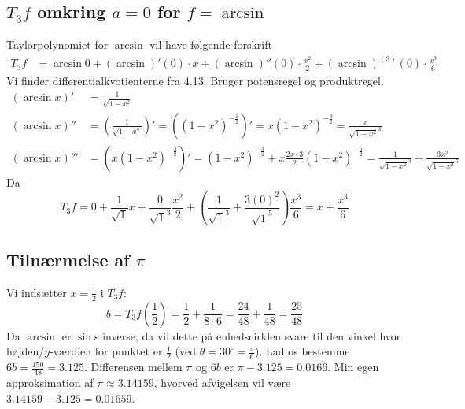\documentclass{report}
\begin{document}
\subsection{$T_3f$ omkring $a=0$ for $f=\arcsin$}
Taylorpolynomiet for $\arcsin$ vil have følgende forskrift
\begin{align}
    T_3f&=\arcsin{0}+\left(\arcsin\right)'(0)\cdot x+\left(\arcsin\right)''(0)\cdot\frac{x^2}{2}+\left(\arcsin\right)^{(3)}(0)\cdot\frac{x^3}{6}
\end{align}
Vi finder differentialkvotienterne fra 4.13. Bruger potensregel og produktregel.
\begin{align*}
    (\arcsin{x})'&=\frac{1}{\sqrt{1-x^2}}\\
    (\arcsin{x})''&=\left(\frac{1}{\sqrt{1-x^2}}\right)'=\left((1-x^2)^{-\frac{1}{2}}\right)'=x(1-x^2)^{-\frac{3}{2}}=\frac{x}{\sqrt{1-x^2}^3}\\
    (\arcsin{x})'''&=\left(x(1-x^2)^{-\frac{3}{2}}\right)'=(1-x^2)^{-\frac{3}{2}}+x\frac{2x\cdot3}{2}(1-x^2)^{-\frac{5}{2}}=\frac{1}{\sqrt{1-x^2}^3}+\frac{3x^2}{\sqrt{1-x^2}^5}
\end{align*}Da 
$$T_3f=0+\frac{1}{\sqrt{1}}x+\frac{0}{\sqrt{1}^3}\frac{x^2}{2}+\left(\frac{1}{\sqrt{1}^3}+\frac{3(0)^2}{\sqrt{1}^5}\right)\frac{x^3}{6}=x+\frac{x^3}{6}$$
\subsection{Tilnærmelse af $\pi$}
Vi indsætter $x=\frac{1}{2}$ i $T_3f$:\begin{equation}
    b=T_3f\left(\frac{1}{2}\right)=\frac{1}{2}+\frac{1}{8\cdot6}=\frac{24}{48}+\frac{1}{48}=\frac{25}{48}
\end{equation}
Da $\arcsin$ er $\sin$s inverse, da vil dette på enhedscirklen svare til den vinkel hvor højden/$y$-værdien for punktet er $\frac{1}{2}$ (ved $\theta=30^\circ=\frac{\pi}{6}$). Lad os bestemme $6b=\frac{150}{48}=3.125$. Differensen mellem $\pi$ og $6b$ er $\pi-3.125=0.0166$. Min egen approksimation af $\pi\approx3.14159$, hvorved afvigelsen vil være $3.14159-3.125=0.01659$.
\end{document}
